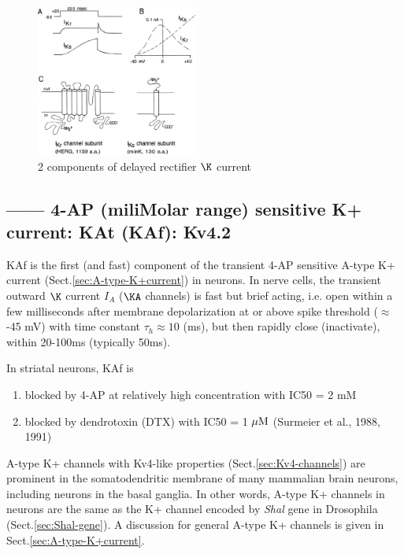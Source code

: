 \begin{figure}[hbt]
  \centerline{\includegraphics[height=5cm,
    angle=0]{./images/IKr_IKs_currents.eps}}
  \caption{2 components of delayed rectifier $\K$ current \citep{sanguinetti1997}}
\label{fig:Kcurrent_IKs_IKr}
\end{figure}


\subsection{------  4-AP (miliMolar range) sensitive K+ current: KAt (KAf): 
Kv4.2}
\label{sec:K+current_4-AP-sensitive-KAt}
\label{sec:KAf-current}
\label{sec:A-type-Kv4-like}

KAf is the first (and fast) component of the transient 4-AP sensitive A-type K+
current (Sect.\ref{sec:A-type-K+current}) in neurons.
In nerve cells, the transient outward $\K$ current $I_A$  ($\KA$ channels) is
fast but brief acting, i.e. open within a few milliseconds after membrane
depolarization at or above spike threshold ($\approx$ -45 mV) with time constant
$\tau_h \approx 10$ (ms), but then rapidly close (inactivate), within 20-100ms
(typically 50ms).

In striatal neurons, KAf is
\begin{enumerate}
  \item blocked by 4-AP at relatively high concentration with IC50 = 2 mM
  
  \item blocked by dendrotoxin (DTX) with IC50 = 1 ${\mu\text{M}}$ (Surmeier et al.,
  1988, 1991)
\end{enumerate}


A-type K+ channels with Kv4-like properties (Sect.\ref{sec:Kv4-channels}) are
prominent in the somatodendritic membrane of many mammalian brain neurons,
including neurons in the basal ganglia. In other words, A-type K+ channels in
neurons are the same as the K+ channel encoded by {\it Shal} gene in Drosophila
(Sect.\ref{sec:Shal-gene}).  A discussion for general A-type K+ channels is
given in Sect.\ref{sec:A-type-K+current}.

